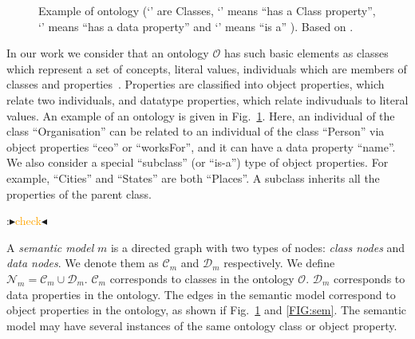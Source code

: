 \documentclass[letterpaper]{article} %
\newcommand{\authornote}[3]{
  {\fbox{\sc 
  #1}:$\blacktriangleright$\textcolor{#2}{\small{#3}}$\blacktriangleleft$}%
}
\newcommand{\npr}[1]{\authornote{NPR}{orange}{#1}}
\begin{document}
\begin{figure}[ht]
\caption{Example of ontology
(`' are Classes, `' means ``has a Class property'', 
`' 
means ``has 
a data 
property'' and 
`' means ``is a'' ). Based on 
\cite{Taheriyan2013}.
}
\label{FIG:onto}
\end{figure}

In our work we consider that an ontology $\mathcal{O}$ has such basic elements as classes which represent a set of concepts, literal values, individuals which are members of classes and properties~\cite{Spanos:semweb}.
Properties are classified into object properties, which relate two individuals, and datatype properties, which relate indivuduals to literal values.
An example of an ontology is given in Fig.~\ref{FIG:onto}. 
Here, an individual of the class ``Organisation'' can be related to an individual of the class ``Person'' via object properties ``ceo'' or ``worksFor'', and it can have a data property ``name''. 
We also consider a special ``subclass'' (or ``is-a'') type of object properties.
For 
example, ``Cities'' and ``States'' are both ``Places''. 
A subclass inherits all the properties of the parent class.
\npr{check}

A \emph{semantic model} $m$ is a directed graph with two types of nodes: 
\emph{class nodes} and \emph{data nodes}. 
We denote them as $\mathcal{C}_m$ and $\mathcal{D}_m$ respectively.
 We define $\mathcal{N}_m = \mathcal{C}_m \cup 
\mathcal{D}_m$. $ \mathcal{C}_m$ corresponds to classes in the ontology 
$\mathcal{O}$. $\mathcal{D}_m$ corresponds to data 
properties in the ontology. 
The edges in the semantic model correspond to object properties in the ontology, as shown if Fig.~\ref{FIG:onto} and \ref{FIG:sem}.
The semantic model may have several instances of the same ontology class or object property.
\end{document}
